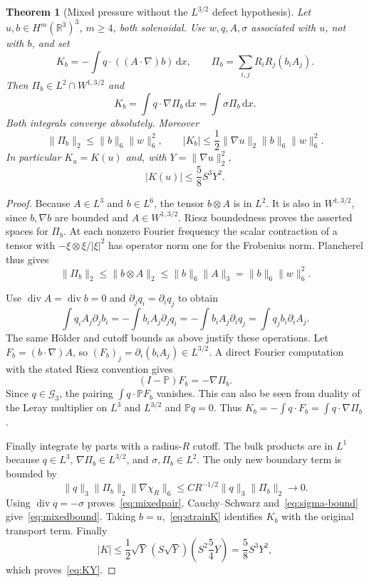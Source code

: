 \documentclass[11pt,a4paper]{article}
\newtheorem{theorem}{Theorem}[section]
\theoremstyle{definition}
\newcommand{\R}{\mathbb R}
\newcommand{\G}{\mathcal G_3}
\newcommand{\PP}{\mathbb P}
\newcommand{\dd}{\,\mathrm dx}
\DeclareMathOperator{\diver}{div}
\begin{document}
\begin{theorem}[Mixed pressure without the $L^{3/2}$ defect hypothesis]\label{thm:mixed}
Let $u,b\in H^m(\R^3)^3$, $m\ge4$, both solenoidal. Use $w,q,A,\sigma$ associated with $u$, not with $b$, and set
\begin{equation}\label{eq:mixeddef}
 K_b=-\int q\cdot((A\cdot\nabla)b)\dd,
 \qquad \Pi_b=\sum_{i,j}R_iR_j(b_iA_j).
\end{equation}
Then $\Pi_b\in L^2\cap W^{1,3/2}$ and
\begin{equation}\label{eq:mixedpair}
 \boxed{\quad K_b=\int q\cdot\nabla\Pi_b\dd
                 =\int\sigma\Pi_b\dd.\quad}
\end{equation}
Both integrals converge absolutely. Moreover
\begin{equation}\label{eq:mixedbound}
 \|\Pi_b\|_2\le\|b\|_6\|w\|_6^2,\qquad
 |K_b|\le\frac12\|\nabla u\|_2\|b\|_6\|w\|_6^2.
\end{equation}
In particular $K_u=K(u)$ and, with $Y=\|\nabla u\|_2^2$,
\begin{equation}\label{eq:KY}
 \boxed{\quad |K(u)|\le\frac58 S^3Y^2.\quad}
\end{equation}
\end{theorem}
\begin{proof}
Because $A\in L^3$ and $b\in L^6$, the tensor $b\otimes A$ is in $L^2$. It is also in $W^{1,3/2}$, since $b,\nabla b$ are bounded and $A\in W^{1,3/2}$. Riesz boundedness proves the asserted spaces for $\Pi_b$. At each nonzero Fourier frequency the scalar contraction of a tensor with $-\xi\otimes\xi/|\xi|^2$ has operator norm one for the Frobenius norm. Plancherel thus gives
\[
 \|\Pi_b\|_2\le\|b\otimes A\|_2\le\|b\|_6\|A\|_3
 =\|b\|_6\|w\|_6^2.
\]

Use $\diver A=\diver b=0$ and $\partial_jq_i=\partial_iq_j$ to obtain
\[
 \int q_iA_j\partial_jb_i
 =-\int b_iA_j\partial_jq_i
 =-\int b_iA_j\partial_iq_j
 =\int q_jb_i\partial_iA_j.
\]
The same H\"older and cutoff bounds as above justify these operations. Let $F_b=(b\cdot\nabla)A$, so $(F_b)_j=\partial_i(b_iA_j)\in L^{3/2}$. A direct Fourier computation with the stated Riesz convention gives
\begin{equation}\label{eq:rieszsign}
 (I-\PP)F_b=-\nabla\Pi_b.
\end{equation}
Since $q\in\G$, the pairing $\int q\cdot\PP F_b$ vanishes. This can also be seen from duality of the Leray multiplier on $L^3$ and $L^{3/2}$ and $\PP q=0$. Thus
$K_b=-\int q\cdot F_b=\int q\cdot\nabla\Pi_b$.

Finally integrate by parts with a radius-$R$ cutoff. The bulk products are in $L^1$ because $q\in L^3$, $\nabla\Pi_b\in L^{3/2}$, and $\sigma,\Pi_b\in L^2$. The only new boundary term is bounded by
\[
 \|q\|_3\|\Pi_b\|_2\|\nabla\chi_R\|_6
 \le CR^{-1/2}\|q\|_3\|\Pi_b\|_2\longrightarrow0.
\]
Using $\diver q=-\sigma$ proves~\eqref{eq:mixedpair}. Cauchy--Schwarz and~\eqref{eq:sigma-bound} give~\eqref{eq:mixedbound}. Taking $b=u$,~\eqref{eq:strainK} identifies $K_b$ with the original transport term. Finally
\[
 |K|\le\frac12\sqrt Y\,(S\sqrt Y)
                   \left(S^2\frac54Y\right)=\frac58S^3Y^2,
\]
which proves~\eqref{eq:KY}.
\end{proof}
\end{document}
